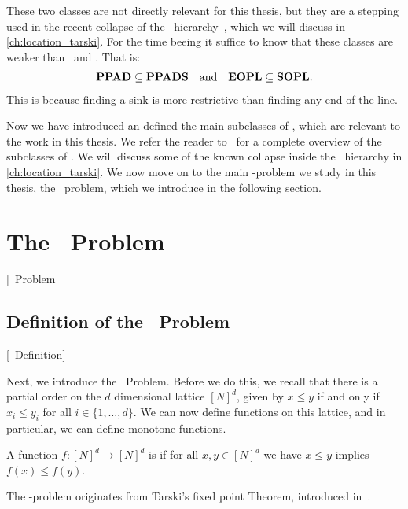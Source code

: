 These two classes are not directly relevant for this thesis, but they are a stepping used in the recent collapse of the \TFNP\ hierarchy~, which we will discuss in \cref{ch:location_tarski}. For the time beeing it suffice to know that these classes are weaker than \PPAD\ and \EOPL\@. That is:
\begin{align*}
	\textbf{PPAD} \subseteq \textbf{PPADS} \quad \text{and} \quad \textbf{EOPL} \subseteq \textbf{SOPL}.
\end{align*}
This is because finding a sink is more restrictive than finding any end of the line.

Now we have introduced an defined the main subclasses of \TFNP, which are relevant to the work in this thesis. We refer the reader to~ for a complete overview of the subclasses of \TFNP\@. We will discuss some of the known collapse inside the \TFNP\ hierarchy in \cref{ch:location_tarski}. We now move on to the main \TFNP-problem we study in this thesis, the \Tarski\ problem, which we introduce in the following section.

\section{The \Tarski\ Problem}[\Tarski\ Problem]\label{sec:tarski_problem}

\subsection{Definition of the \Tarski\ Problem}[\Tarski\ Definition]

Next, we introduce the \Tarski\ Problem. Before we do this, we recall that there is a partial order on the $d$ dimensional lattice ${[N]}^d$, given by $x \leq y$ if and only if $x_i \leq y_i$ for all $i \in \{1, \dots, d\}$. We can now define functions on this lattice, and in particular, we can define monotone functions.

\begin{definition}
	A function $f : {[N]}^d \rightarrow {[N]}^d$ is  if for all $x, y \in {[N]}^d$ we have $x \leq y$ implies $f(x) \leq f(y)$.
\end{definition}

The \Tarski-problem originates from Tarski's fixed point Theorem, introduced in~.

